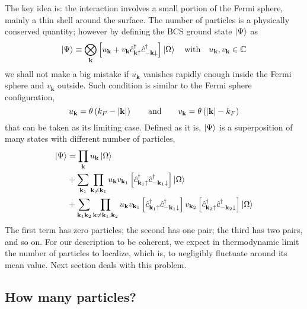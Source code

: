 The key idea is: the interaction involves a small portion of the Fermi sphere, mainly a thin shell around the surface. The number of particles is a physically conserved quantity; however by defining the BCS ground state $\ket{\Psi}$ as
\begin{equation}\label{eq:bcs ground state general form}
	\ket{\Psi} \equiv \bigotimes_\mathbf{k} \lrS{u_\mathbf{k} + v_\mathbf{k} \hat{c}_{\mathbf{k}\uparrow}^\dagger \hat{c}_{-\mathbf{k}\downarrow}^\dagger} \ket{\Omega}
	\qq{with}
	u_\mathbf{k}, v_\mathbf{k} \in \C
\end{equation}
we shall not make a big mistake if $u_\mathbf{k}$ vanishes rapidly enough inside the Fermi sphere and $v_\mathbf{k}$ outside. Such condition is similar to the Fermi sphere configuration,
\[
	u_\mathbf{k} = \theta\lrR{k_F - \abs{\mathbf{k}}}
	\quad\qq{and}\quad
	v_\mathbf{k} = \theta\lrR{\abs{\mathbf{k}} - k_F}
\]
that can be taken as its limiting case.
Defined as it is, $\ket{\Psi}$ is a superposition of many states with different number of particles,
\[
\begin{aligned}
	\ket{\Psi} &= \prod_\mathbf{k} u_\mathbf{k} \ket{\Omega} \\
	&+ \sum_{\mathbf{k}_1} \prod_{\mathbf{k} \neq \mathbf{k}_1} u_\mathbf{k} v_{\mathbf{k}_1} \left[{\hat{c}_{\mathbf{k}_1\uparrow}^\dagger \hat{c}_{-\mathbf{k}_1\downarrow}^\dagger}\right] \ket{\Omega} \\
	&+ \sum_{\mathbf{k}_1 \mathbf{k}_2} \prod_{\mathbf{k} \neq \mathbf{k}_1, \mathbf{k}_2} u_\mathbf{k} v_{\mathbf{k}_1} \left[{\hat{c}_{\mathbf{k}_1\uparrow}^\dagger \hat{c}_{-\mathbf{k}_1\downarrow}^\dagger}\right] v_{\mathbf{k}_2} \left[{\hat{c}_{\mathbf{k}_2\uparrow}^\dagger \hat{c}_{-\mathbf{k}_2\downarrow}^\dagger}\right] \ket{\Omega}
\end{aligned}
\]
The first term has zero particles; the second has one pair; the third has two pairs, and so on. For our description to be coherent, we expect in thermodynamic limit the number of particles to localize, which is, to negligibly fluctuate around its mean value. Next section deals with this problem.

\subsection{How many particles?}

